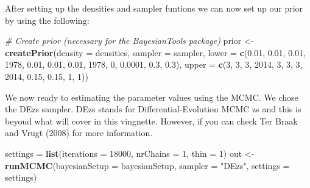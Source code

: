 \documentclass[12pt,]{article}
\newenvironment{Shaded}{\begin{snugshade}}{\end{snugshade}}
\newcommand{\CommentTok}[1]{\textcolor[rgb]{0.56,0.35,0.01}{\textit{#1}}}
\newcommand{\DataTypeTok}[1]{\textcolor[rgb]{0.13,0.29,0.53}{#1}}
\newcommand{\DecValTok}[1]{\textcolor[rgb]{0.00,0.00,0.81}{#1}}
\newcommand{\FloatTok}[1]{\textcolor[rgb]{0.00,0.00,0.81}{#1}}
\newcommand{\KeywordTok}[1]{\textcolor[rgb]{0.13,0.29,0.53}{\textbf{#1}}}
\newcommand{\NormalTok}[1]{#1}
\newcommand{\StringTok}[1]{\textcolor[rgb]{0.31,0.60,0.02}{#1}}
\begin{document}
After setting up the densities and sampler funtions we can now set up
our prior by using the following:

\begin{Shaded}
\begin{Highlighting}[]
\CommentTok{# Create prior (necessary for the BayesianTools package)}
\NormalTok{prior <-}\StringTok{ }\KeywordTok{createPrior}\NormalTok{(}\DataTypeTok{density =}\NormalTok{ densities, }
                     \DataTypeTok{sampler =}\NormalTok{ sampler, }
                     \DataTypeTok{lower =} \KeywordTok{c}\NormalTok{(}\FloatTok{0.01}\NormalTok{, }\FloatTok{0.01}\NormalTok{, }\FloatTok{0.01}\NormalTok{, }
                               \DecValTok{1978}\NormalTok{, }\FloatTok{0.01}\NormalTok{, }\FloatTok{0.01}\NormalTok{, }
                               \FloatTok{0.01}\NormalTok{, }\DecValTok{1978}\NormalTok{, }\DecValTok{0}\NormalTok{, }
                               \FloatTok{0.0001}\NormalTok{, }\FloatTok{0.3}\NormalTok{, }\FloatTok{0.3}\NormalTok{), }
                     \DataTypeTok{upper =} \KeywordTok{c}\NormalTok{(}\DecValTok{3}\NormalTok{, }\DecValTok{3}\NormalTok{, }\DecValTok{3}\NormalTok{, }
                               \DecValTok{2014}\NormalTok{, }\DecValTok{3}\NormalTok{, }\DecValTok{3}\NormalTok{, }
                               \DecValTok{3}\NormalTok{, }\DecValTok{2014}\NormalTok{, }\FloatTok{0.15}\NormalTok{, }
                               \FloatTok{0.15}\NormalTok{, }\DecValTok{1}\NormalTok{, }\DecValTok{1}\NormalTok{))}
\end{Highlighting}
\end{Shaded}

We now ready to estimating the parameter values using the MCMC. We chose
the DEzs sampler. DEzs stands for Differential-Evolution MCMC zs and
this is beyoud what will cover in this vingnette. However, if you can
check Ter Braak and Vrugt (2008) for more information.

\begin{Shaded}
\begin{Highlighting}[]
\NormalTok{settings =}\StringTok{ }\KeywordTok{list}\NormalTok{(}\DataTypeTok{iterations =} \DecValTok{18000}\NormalTok{, }\DataTypeTok{nrChains =} \DecValTok{1}\NormalTok{, }\DataTypeTok{thin =} \DecValTok{1}\NormalTok{)}
\NormalTok{out <-}\StringTok{ }\KeywordTok{runMCMC}\NormalTok{(}\DataTypeTok{bayesianSetup =}\NormalTok{ bayesianSetup, }
               \DataTypeTok{sampler =} \StringTok{"DEzs"}\NormalTok{, }
               \DataTypeTok{settings =}\NormalTok{ settings)}
\end{Highlighting}
\end{Shaded}
\end{document}
